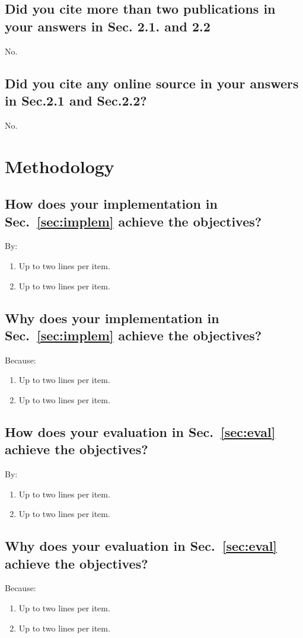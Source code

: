 \subsection{Did you cite more than two publications in your answers in Sec. 2.1. and 2.2}
No.
	
\subsection{Did you cite any online source in your answers in Sec.2.1 and Sec.2.2?}
No.


\section{Methodology}

\subsection{How does your implementation in Sec.~\ref{sec:implem} achieve the objectives?}
By:
\begin{enumerate}
	\item Up to two lines per item.
	\item Up to two lines per item.
\end{enumerate}

\subsection{Why does your implementation in Sec.~\ref{sec:implem} achieve the objectives?}
Because:
\begin{enumerate}
	\item Up to two lines per item.
	\item Up to two lines per item.
\end{enumerate}

\subsection{How does your evaluation in Sec.~\ref{sec:eval} achieve the objectives?}
By:
\begin{enumerate}
	\item Up to two lines per item.
	\item Up to two lines per item.
\end{enumerate}

\subsection{Why does your evaluation in Sec.~\ref{sec:eval}  achieve the objectives?}
Because:
\begin{enumerate}
	\item Up to two lines per item.
	\item Up to two lines per item.
\end{enumerate}



